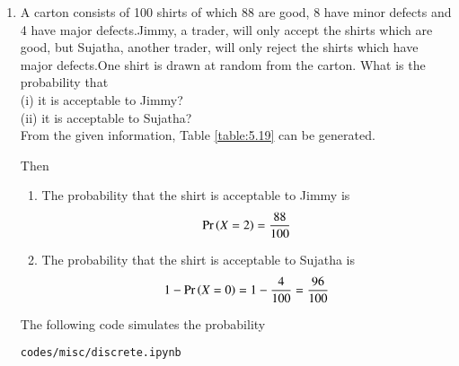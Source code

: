 \begin{enumerate}[label=\thesection.\arabic*.,ref=\thesection.\theenumi]

\item A carton consists of 100 shirts of which 88 are good, 8 have minor defects and 4 have major defects.Jimmy, a trader, will only accept the shirts which are good, but Sujatha, another trader, will only reject the shirts which have major defects.One shirt is drawn at random from the carton. What is the probability that\\
(i) it is acceptable to Jimmy?\\
(ii) it is acceptable to Sujatha?
\\
\solution
From the given information, Table \ref{table:5.19} can be generated.
\begin{table}[!ht]
\centering
{}
\caption{Random variables}
\label{table:5.19}
\end{table}
Then
\begin{enumerate}
\item The probability that the shirt is acceptable to Jimmy is
\begin{align}
\Pr\left(X=2\right)=\frac{88}{100}
\end{align}
%
\item The probability that the shirt is acceptable to Sujatha is
\begin{align}
1-\Pr\left(X=0\right)=1-\frac{4}{100} = \frac{96}{100}
\end{align}

\end{enumerate}
%
The following code simulates the probability
\begin{lstlisting}
codes/misc/discrete.ipynb
\end{lstlisting}
\end{enumerate}
